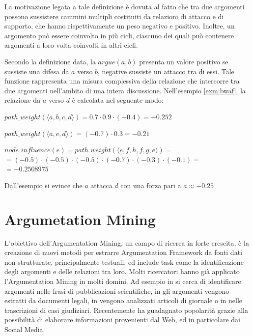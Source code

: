 La motivazione legata a tale definizione è dovuta al fatto che tra due argomenti possono sussistere
cammini multipli costituiti da relazioni di attacco e di supporto, che hanno rispettivamente un
peso negativo e positivo. Inoltre, un argomento può essere coinvolto in più cicli, ciascuno dei
quali può contenere argomenti a loro volta coinvolti in altri cicli. 

Secondo la definizione data, la $argue(a,b)$ presenta un valore positivo se sussiste una difesa da $a$ verso $b$, negative sussiste un attacco tra di essi. Tale funzione rappresenta una misura complessiva della relazione che intercorre tra due argomenti nell'ambito di una intera discussione. Nell'esempio \ref{exm:bwaf}, la relazione da $a$ verso $d$ è calcolata nel seguente modo:

\begin{center}

    $path\_weight(⟨a,b,c,d⟩) = 0.7 \cdot 0.9 \cdot (-0.4) = -0.252$
    
    $path\_weight(⟨a,e,d⟩) = (-0.7) \cdot 0.3 = -0.21$
    
    $node\_influence(e) = path\_weight(⟨e,f,h,f,g,e⟩) =$ \\ 
    $= (-0.5) \cdot (-0.5) \cdot(-0.5) \cdot (-0.7) \cdot (-0.3) \cdot (-0.1) =$ \\
    $= -0.2508975$
    
\end{center}

Dall'esempio si evince che $a$ attacca $d$ con una forza pari a $a \approx -0.25$


\section{Argumetation Mining}
 L'obiettivo dell'Argumentation Mining, un campo di ricerca in forte crescita, è la creazione di nuovi metodi per estrarre Argumentation Framework da fonti dati non strutturate, principalmente testuali, ed include task come la identificazione degli argomenti e delle relazioni tra loro. Molti ricercatori hanno già applicato l'Argumentation Mining in molti domini. Ad esempio in \cite{teufel1999annotation} si cerca di identificare argomenti nelle frasi di pubblicazioni scientifiche, in \cite{moens2007automatic} gli argomenti vengono estratti da documenti legali, in \cite{feng2011classifying} vengono analizzati articoli di giornale o in \cite{florou2013argument} nelle trascrizioni di casi giudiziari. Recentemente ha guadagnato popolarità grazie alla possibilità di elaborare informazioni provenienti dal Web, ed in particolare dai Social Media.

